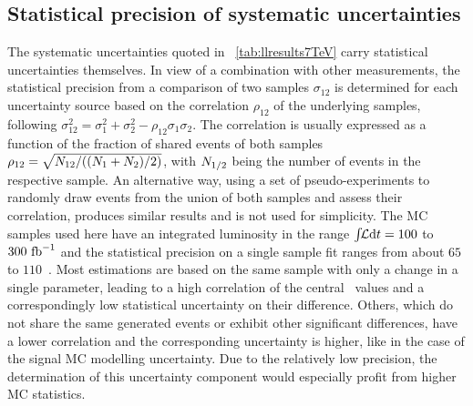 \subsection{Statistical precision of systematic uncertainties}
\label{sect:syststat}
%
The systematic uncertainties quoted in \tab~\ref{tab:llresults7TeV} carry statistical uncertainties themselves. In view of a combination with other measurements, the statistical precision from a comparison of two samples $\sigma_{12}$ is determined for each uncertainty source based on the correlation $\rho_{12}$ of the underlying samples, following $\sigma_{12}^2=\sigma_1^2+\sigma_2^2-\rho_{12}\sigma_1\sigma_2$. The correlation is usually expressed as a function of the fraction of shared events of both samples $\rho_{12}=\sqrt{N_{\mathrm{12}}/((N_{\mathrm{1}}+N_{\mathrm{2}})/2)}$, with $N_{\mathrm{1/2}}$ being the number of events in the respective sample. An alternative way, using a set of pseudo-experiments to randomly draw events from the union of both samples and assess their correlation, produces similar results and is not used for simplicity. 
%
The \gls{MC} samples used here have an integrated luminosity in the range $\int\!\!{\mathcal L}\mathrm{d}t=100$ to $300~\mathrm{fb}^{-1}$ and the statistical precision on a single sample fit ranges from about $65$ to $110$~\MeV. 
%
Most estimations are based on the same sample with only a change in a single parameter, leading to a high correlation of the central \mt\ values and a correspondingly low statistical uncertainty on their difference. 
%
Others, which do not share the same generated events or exhibit other significant differences, have a lower correlation and the corresponding uncertainty is higher, like in the case of the signal \gls{MC} modelling uncertainty. Due to the relatively low precision, the determination of this uncertainty component would especially profit from higher \gls{MC} statistics.


